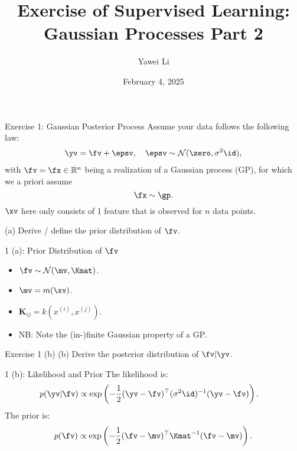 \documentclass[aspectratio=169]{beamer}
\title[]{\textbf{Exercise of Supervised Learning: \\ Gaussian Processes Part 2}}
\author{Yawei Li}
\institute[LMU]
{
\\
  \texttt{yawei.li@stat.uni-muenchen.de}
}
\date{February 4, 2025}
\renewcommand{\N}{\mathcal{N}}
\renewcommand{\R}{\mathbb{R}}
\newcommand{\kij}{\bm{K}_{ij}}
\renewcommand{\kxij}{k(x^{(i)}, x^{(j)})}
\begin{document}
\begin{frame}
\titlepage

\end{frame}

\begin{frame}{Exercise 1: Gaussian Posterior Process}
Assume your data follows the following law:
\begin{align*}
	\yv = \fv + \epsv, \quad \epsv \sim \N(\zero, \sigma^2 \id),
\end{align*}
with $\fv = \fx \in \R^n$ being a realization of a Gaussian process (GP), for which we a priori assume 
\begin{equation*}
	\fx \sim \gp.
\end{equation*}
$\xv$ here only consists of 1 feature that is observed for $n$ data points.

(a) Derive / define the prior distribution of $\fv$.
\end{frame}

\begin{frame}{1 (a): Prior Distribution of $\fv$}
	\begin{itemize}
		\item $\fv \sim \N(\mv, \Kmat)$.
		\item $\mv = m (\xv)$.
		\item $\kij = \kxij$. 
		\item NB: Note the (in-)finite Gaussian property of a GP.
	\end{itemize}
\end{frame}

\begin{frame}{Exercise 1 (b)}
	(b) Derive the posterior distribution of $\fv | \yv$.
\end{frame}

\begin{frame}{1 (b): Likelihood and Prior}
\small
The likelihood is:
	\begin{equation*}
		\begin{aligned}
			p(\yv | \fv)
			&\propto \exp \left( -\frac{1}{2} (\yv - \fv)^\top (\sigma^2 \id)^{-1} (\yv - \fv) \right).
		\end{aligned}
	\end{equation*}
The prior is:
	\begin{align*}
		p(\fv) \propto \exp\left( - \frac{1}{2}(\fv - \mv)^\top \Kmat^{-1} (\fv - \mv) \right).
	\end{align*}
\end{frame}
\end{document}

